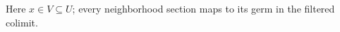 \begin{center}
\end{center}
\noindent Here $x\in V\subseteq U$; every neighborhood section maps to its germ in the filtered colimit.
